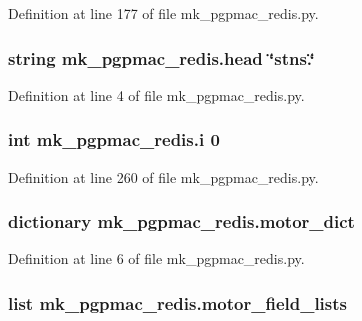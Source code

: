 Definition at line 177 of file mk\-\_\-pgpmac\-\_\-redis.\-py.

\hypertarget{namespacemk__pgpmac__redis_a3a09e1c5bb44c0bb2175c311655d1b15}{
\subsubsection[{head}]{\setlength{\rightskip}{0pt plus 5cm}string mk\-\_\-pgpmac\-\_\-redis.\-head \char`\"{}stns.\char`\"{}}}\label{namespacemk__pgpmac__redis_a3a09e1c5bb44c0bb2175c311655d1b15}


Definition at line 4 of file mk\-\_\-pgpmac\-\_\-redis.\-py.

\hypertarget{namespacemk__pgpmac__redis_afa643a23a5984fe44c2182ada3dfa401}{
\subsubsection[{i}]{\setlength{\rightskip}{0pt plus 5cm}int mk\-\_\-pgpmac\-\_\-redis.\-i 0}}\label{namespacemk__pgpmac__redis_afa643a23a5984fe44c2182ada3dfa401}


Definition at line 260 of file mk\-\_\-pgpmac\-\_\-redis.\-py.

\hypertarget{namespacemk__pgpmac__redis_ad8583d4fe88c4c98af73d2858c51c660}{
\subsubsection[{motor\-\_\-dict}]{\setlength{\rightskip}{0pt plus 5cm}dictionary mk\-\_\-pgpmac\-\_\-redis.\-motor\-\_\-dict}}\label{namespacemk__pgpmac__redis_ad8583d4fe88c4c98af73d2858c51c660}


Definition at line 6 of file mk\-\_\-pgpmac\-\_\-redis.\-py.

\hypertarget{namespacemk__pgpmac__redis_a7228dc1b6ecec376538db1efe8c05ffb}{
\subsubsection[{motor\-\_\-field\-\_\-lists}]{\setlength{\rightskip}{0pt plus 5cm}list mk\-\_\-pgpmac\-\_\-redis.\-motor\-\_\-field\-\_\-lists}}\label{namespacemk__pgpmac__redis_a7228dc1b6ecec376538db1efe8c05ffb}



